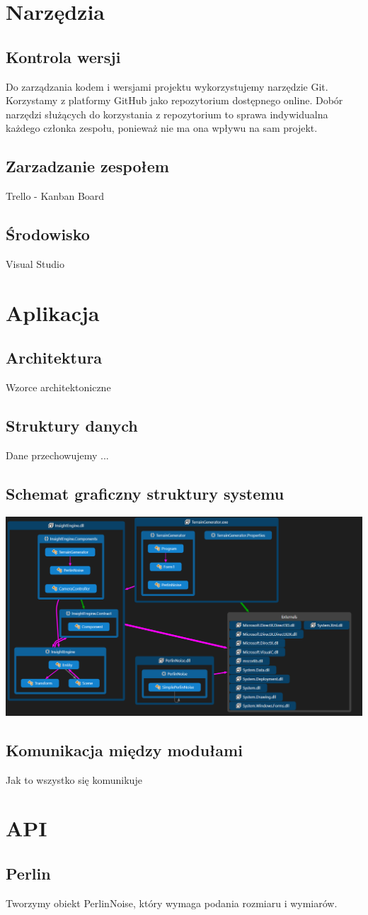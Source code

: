 \documentclass[12pt,a4paper]{article}
\begin{document}
\section{Narzędzia}
\subsection{Kontrola wersji}
Do zarządzania kodem i wersjami projektu wykorzystujemy narzędzie Git. Korzystamy z platformy GitHub jako repozytorium dostępnego online. Dobór narzędzi służących do korzystania z repozytorium to sprawa indywidualna każdego członka zespołu, ponieważ nie ma ona wpływu na sam projekt.
\subsection{Zarzadzanie zespołem}
Trello - Kanban Board
\subsection{Środowisko}
Visual Studio
\section{Aplikacja}
\subsection{Architektura}
Wzorce architektoniczne
\subsection{Struktury danych}
Dane przechowujemy ...
\subsection{Schemat graficzny struktury systemu}
\includegraphics[width=1\textwidth]{images/klasy.png}
\subsection{Komunikacja między modułami}
Jak to wszystko się komunikuje
\section{API}
\subsection{Perlin}
Tworzymy obiekt PerlinNoise, który wymaga podania rozmiaru i wymiarów.
\end{document}
